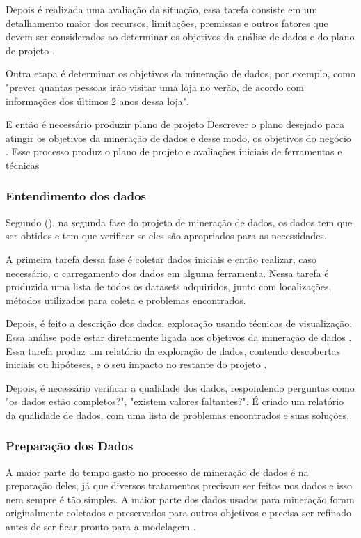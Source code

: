Depois é realizada uma avaliação da situação, essa tarefa consiste em um detalhamento maior dos recursos, limitações, premissas e outros fatores que devem ser considerados ao determinar os objetivos da análise de dados e do plano de projeto \citep[p. 14]{crispmanual}.

Outra etapa é determinar os objetivos da mineração de dados, por exemplo, como "prever quantas pessoas irão visitar uma loja no verão, de acordo com informações dos últimos 2 anos dessa loja".

E então é necessário produzir plano de projeto Descrever o plano desejado para atingir os objetivos da mineração de dados e desse modo, os objetivos do negócio \citep{crispmanual}. Esse processo produz o plano de projeto e avaliações iniciais de ferramentas e técnicas

\subsubsection{Entendimento dos dados}
Segundo \citeauthor{dmfd} (\citeyear{dmfd}), na segunda fase do projeto de mineração de dados, os dados tem que ser obtidos e tem que verificar se eles são apropriados para as necessidades.

A primeira tarefa dessa fase é coletar dados iniciais e então realizar, caso necessário, o carregamento dos dados em alguma ferramenta. Nessa tarefa é produzida uma lista de todos os datasets adquiridos, junto com localizações, métodos utilizados para coleta e problemas encontrados.

Depois, é feito a descrição dos dados, exploração usando técnicas de visualização. Essa análise pode estar diretamente ligada aos objetivos da mineração de dados \citep{crispmanual}. Essa tarefa produz um relatório da exploração de dados, contendo descobertas iniciais ou hipóteses, e o seu impacto no restante do projeto \citep{crispmanual}.

Depois, é necessário verificar a qualidade dos dados, respondendo perguntas como "os dados estão completos?", "existem valores faltantes?". É criado um relatório da qualidade de dados, com uma lista de problemas encontrados e suas soluções.

\subsubsection{Preparação dos Dados}
A maior parte do tempo gasto no processo de mineração de dados é na preparação deles, já que diversos tratamentos precisam ser feitos nos dados e isso nem sempre é tão simples. A maior parte dos dados usados para mineração foram originalmente coletados e preservados para outros objetivos e precisa ser refinado antes de ser ficar pronto para a modelagem \citep{dmfd}.

